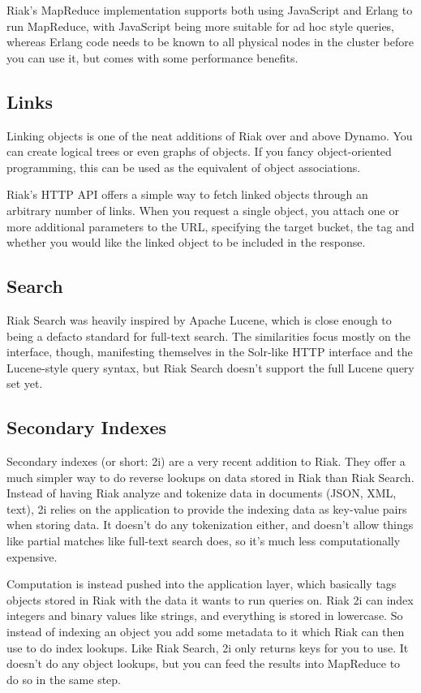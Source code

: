 Riak's MapReduce implementation supports both using JavaScript and Erlang to run MapReduce, with JavaScript being more suitable for ad hoc style queries, whereas Erlang code needs to be known to all physical nodes in the cluster before you can use it, but comes with some performance benefits.

\subsection{Links}

Linking objects is one of the neat additions of Riak over and above Dynamo. You can create logical trees or even graphs of objects. If you fancy object-oriented programming, this can be used as the equivalent of object associations.

Riak's HTTP API offers a simple way to fetch linked objects through an arbitrary number of links. When you request a single object, you attach one or more additional parameters to the URL, specifying the target bucket, the tag and whether you would like the linked object to be included in the response.

\subsection{Search}

Riak Search was heavily inspired by Apache Lucene, which is close enough to being a defacto standard for full-text search. The similarities focus mostly on the interface, though, manifesting themselves in the Solr-like HTTP interface and the Lucene-style query syntax, but Riak Search doesn't support the full Lucene query set yet.

\subsection{Secondary Indexes}

Secondary indexes (or short: 2i) are a very recent addition to Riak. They offer a much simpler way to do reverse lookups on data stored in Riak than Riak Search. Instead of having Riak analyze and tokenize data in documents (JSON, XML, text), 2i relies on the application to provide the indexing data as key-value pairs when storing data. It doesn't do any tokenization either, and doesn't allow things like partial matches like full-text search does, so it's much less computationally expensive.

Computation is instead pushed into the application layer, which basically tags objects stored in Riak with the data it wants to run queries on. Riak 2i can index integers and binary values like strings, and everything is stored in lowercase. So instead of indexing an object you add some metadata to it which Riak can then use to do index lookups. Like Riak Search, 2i only returns keys for you to use. It doesn't do any object lookups, but you can feed the results into MapReduce to do so in the same step.

